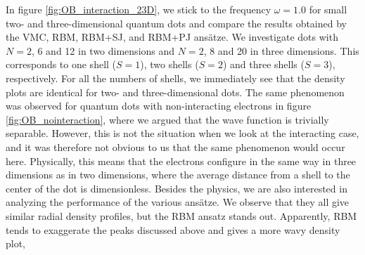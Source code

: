 In figure \eqref{fig:OB_interaction_23D}, we stick to the frequency $\omega=1.0$ for small two- and three-dimensional quantum dots and compare the results obtained by the VMC, RBM, RBM+SJ, and RBM+PJ ansätze. We investigate dots with $N=2$, 6 and 12 in two dimensions and $N=2$, 8 and 20 in three dimensions. This corresponds to one shell ($S=1$), two shells ($S=2$) and three shells ($S=3$), respectively. For all the numbers of shells, we immediately see that the density plots are identical for two- and three-dimensional dots. The same phenomenon was observed for quantum dots with non-interacting electrons in figure \eqref{fig:OB_nointeraction}, where we argued that the wave function is trivially separable. However, this is not the situation when we look at the interacting case, and it was therefore not obvious to us that the same phenomenon would occur here. Physically, this means that the electrons configure in the same way in three dimensions as in two dimensions, where the average distance from a shell to the center of the dot is dimensionless. Besides the physics, we are also interested in analyzing the performance of the various ansätze. We observe that they all give similar radial density profiles, but the RBM ansatz stands out. Apparently, RBM tends to exaggerate the peaks discussed above and gives a more wavy density plot,
